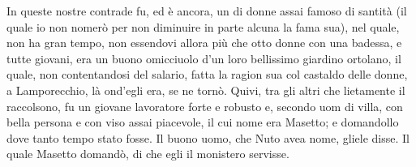 \documentclass[a4paper,11pt]{book}
\begin{document}
\beginnumbering
\pstart
In queste nostre contrade fu, ed è ancora, un  di donne assai famoso di santità 
(il quale io non nomerò per non diminuire in parte alcuna la fama sua), nel quale, non ha gran 
tempo, non essendovi allora più che otto donne con una badessa, e tutte giovani, era un buono 
omicciuolo d'un loro bellissimo giardino ortolano, il quale, non contentandosi del salario, fatta la 
ragion sua col castaldo delle donne, a Lamporecchio, là ond'egli era, se ne tornò. Quivi, tra gli 
altri che lietamente il raccolsono, fu un giovane lavoratore forte e robusto e, secondo uom di villa, 
con bella persona e con viso assai piacevole, il cui nome era Masetto; e 
domandollo dove tanto tempo stato fosse. Il buono uomo, che Nuto avea nome, 
gliele disse. Il quale Masetto domandò, di che egli il monistero servisse. 
\pend
\endnumbering
\printglossaries
\end{document}
